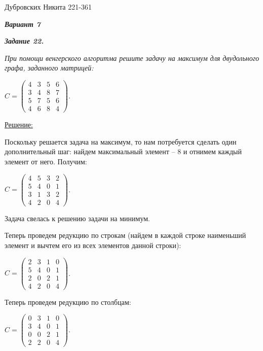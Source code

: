 \documentclass[12pt]{article}
\begin{document}
Дубровских Никита 221-361

\textit{\textbf{Вариант 7}}

\textit{\textbf{Задание 22.}}

\textit{При помощи венгерского алгоритма решите задачу на максимум
для двудольного графа, заданного матрицей:}

\begin{center}
$C = \begin{pmatrix}
	4 & 3 & 5 & 6 \\
	3 & 4 & 8 & 7 \\
	5 & 7 & 5 & 6 \\
	4 & 6 & 8 & 4
\end{pmatrix}$.
\end{center}

\underline{Решение:}

Поскольку решается задача на максимум, то нам потребуется сделать
один дополнительный шаг: найдем максимальный элемент – 8 и отнимем
каждый элемент от него. Получим:

\begin{center}
$C = \begin{pmatrix}
	4 & 5 & 3 & 2 \\
	5 & 4 & 0 & 1 \\
	3 & 1 & 3 & 2 \\
	4 & 2 & 0 & 4
\end{pmatrix}$.
\end{center}

Задача свелась к решению задачи на минимум.

Теперь проведем редукцию по строкам (найдем в каждой строке
наименьший элемент и вычтем его из всех элементов данной строки):

\begin{center}
$C = \begin{pmatrix}
	2 & 3 & 1 & 0 \\
	5 & 4 & 0 & 1 \\
	2 & 0 & 2 & 1 \\
	4 & 2 & 0 & 4
\end{pmatrix}$.
\end{center}

Теперь проведем редукцию по столбцам:

\begin{center}
$C = \begin{pmatrix}
	0 & 3 & 1 & 0 \\
	3 & 4 & 0 & 1 \\
	0 & 0 & 2 & 1 \\
	2 & 2 & 0 & 4
\end{pmatrix}$.
\end{center}
\end{document}
